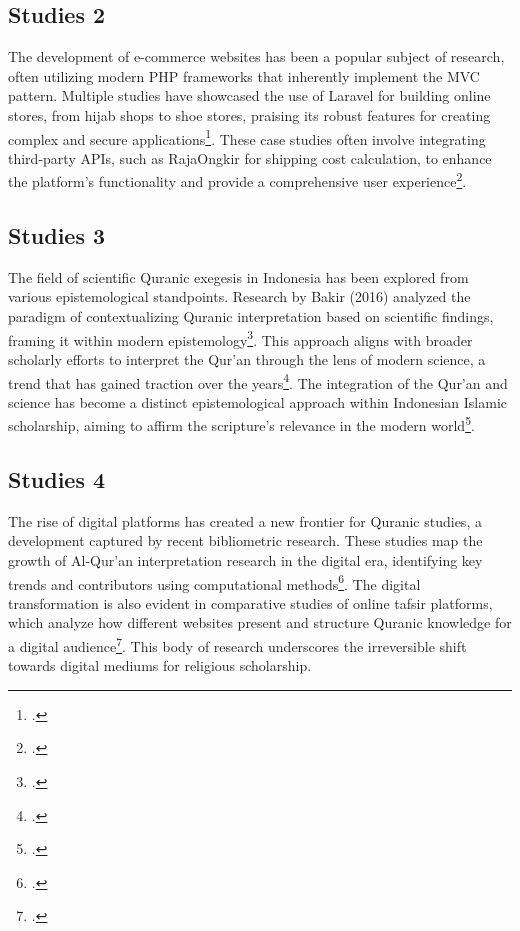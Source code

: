 		\subsection{Studies 2}
		The development of e-commerce websites has been a popular subject of research, often utilizing modern PHP frameworks that inherently implement the MVC pattern. Multiple studies have showcased the use of Laravel for building online stores, from hijab shops to shoe stores, praising its robust features for creating complex and secure applications\footcite{aipina2022, nugroho2021}. These case studies often involve integrating third-party APIs, such as RajaOngkir for shipping cost calculation, to enhance the platform's functionality and provide a comprehensive user experience\footcite{prawito2020}.
			
		\subsection{Studies 3}
		The field of scientific Quranic exegesis in Indonesia has been explored from various epistemological standpoints. Research by Bakir (2016) analyzed the paradigm of contextualizing Quranic interpretation based on scientific findings, framing it within modern epistemology\footcite{bakir2016}. This approach aligns with broader scholarly efforts to interpret the Qur'an through the lens of modern science, a trend that has gained traction over the years\footcite{laila2014}. The integration of the Qur'an and science has become a distinct epistemological approach within Indonesian Islamic scholarship, aiming to affirm the scripture's relevance in the modern world\footcite{supriadi2018}.
				
		\subsection{Studies 4}
		The rise of digital platforms has created a new frontier for Quranic studies, a development captured by recent bibliometric research. These studies map the growth of Al-Qur'an interpretation research in the digital era, identifying key trends and contributors using computational methods\footcite{fadhilah2021}. The digital transformation is also evident in comparative studies of online tafsir platforms, which analyze how different websites present and structure Quranic knowledge for a digital audience\footcite{azizah2024}. This body of research underscores the irreversible shift towards digital mediums for religious scholarship.
					
